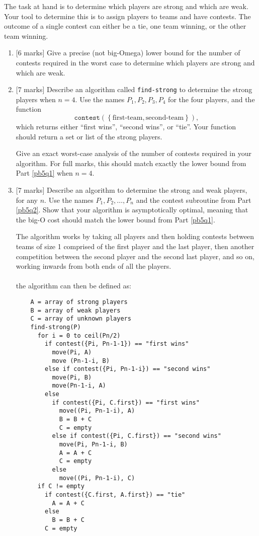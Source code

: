 \documentclass[12pt]{article}
\begin{document}
The task at hand is to determine which players are strong and which are weak.
Your tool to determine this is to assign players to teams and have contests.
The outcome of a single contest can either be a tie, one team winning, or the
other team winning.
\begin{enumerate}
  \item \label{pb5q1}[6 marks] Give a precise (not big-Omega) lower bound for
  the number of contests required in the worst case to determine which players
  are strong and which are weak.
  
  \item \label{pb5q2}[7 marks] Describe an algorithm called
  \texttt{find-strong} to determine the strong players when $n = 4$. Use the
  names $P_1, P_2, P_3, P_4$ for the four players, and the function
  \[ \texttt{contest} \left( \left\{ \textrm{first-team}, \textrm{second-team}
     \right\} \right), \]
  which returns either ``first wins'', ``second wins'', or ``tie''. Your
  function should return a set or list of the strong players.
  
  Give an exact worst-case analysis of the number of contests required in your
  algorithm. For full marks, this should match exactly the lower bound from
  Part \ref{pb5q1} when $n = 4$.
  
  \item {[}7 marks] Describe an algorithm to determine the strong and weak
  players, for any $n$. Use the names $P_1, P_2, \ldots, P_n$ and the contest
  subroutine from Part \ref{pb5q2}. Show that your algorithm is asymptotically
  optimal, meaning that the big-O cost should match the lower bound from Part
  \ref{pb5q1}.

  The algorithm works by taking all players and then holding contests between teams of size 1 comprised of the first player and the last player, then another competition between the second player and the second last player, and so on, working inwards from both ends of all the players.\\\\

  the algorithm can then be defined as:

  \begin{verbatim}
    A = array of strong players
    B = array of weak players
    C = array of unknown players
    find-strong(P)
      for i = 0 to ceil(Pn/2)
        if contest({Pi, Pn-1-1}) == "first wins"
          move(Pi, A)
          move (Pn-1-i, B)
        else if contest({Pi, Pn-1-i}) == "second wins"
          move(Pi, B)
          move(Pn-1-i, A)
        else
          if contest({Pi, C.first}) == "first wins"
            move((Pi, Pn-1-i), A)
            B = B + C
            C = empty
          else if contest({Pi, C.first}) == "second wins"
            move(Pi, Pn-1-i, B)
            A = A + C
            C = empty
          else
            move((Pi, Pn-1-i), C)
      if C != empty
        if contest({C.first, A.first}) == "tie"
          A = A + C
        else
          B = B + C
        C = empty

  \end{verbatim}
\end{enumerate}
\end{document}
